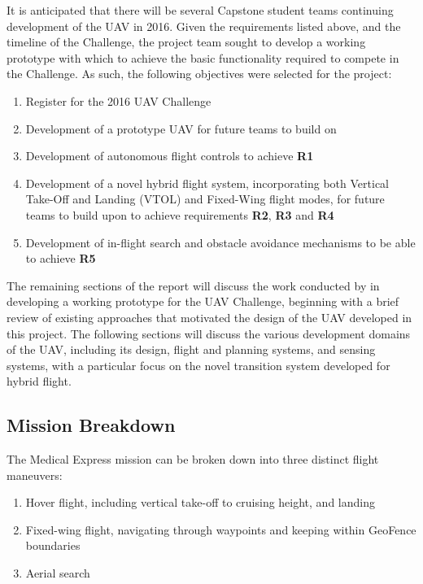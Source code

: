 It is anticipated that there will be several Capstone student teams continuing development of the UAV in 2016. Given the requirements listed above, and the timeline of the Challenge, the \ID project team sought to develop a working prototype with which to achieve the basic functionality required to compete in the Challenge. As such, the following objectives were selected for the project:
\begin{enumerate}[label=\bfseries O\arabic*:] \itemsep-2pt
	\item Register for the 2016 UAV Challenge
	\item Development of a prototype UAV for future teams to build on
	\item Development of autonomous flight controls to achieve \textbf{R1}
	\item Development of a novel hybrid flight system, incorporating both Vertical Take-Off and Landing (VTOL) and Fixed-Wing flight modes, for future teams to build upon to achieve requirements \textbf{R2}, \textbf{R3} and \textbf{R4}
	\item Development of in-flight search and obstacle avoidance mechanisms to be able to achieve \textbf{R5}
\end{enumerate}

The remaining sections of the report will discuss the work conducted by \ID in developing a working prototype for the UAV Challenge, beginning with a brief review of existing approaches that motivated the design of the UAV developed in this project. The following sections will discuss the various development domains of the UAV, including its design, flight and planning systems, and sensing systems, with a particular focus on the novel transition system developed for hybrid flight.

\subsection{Mission Breakdown}
\label{sec:flightmaneuvers}
The Medical Express mission can be broken down into three distinct flight maneuvers:
\begin{enumerate}[label=\bfseries M\arabic*:] \itemsep-2pt
	\item Hover flight, including vertical take-off to cruising height, and landing
	\item Fixed-wing flight, navigating through waypoints and keeping within GeoFence boundaries
	\item Aerial search
\end{enumerate}

